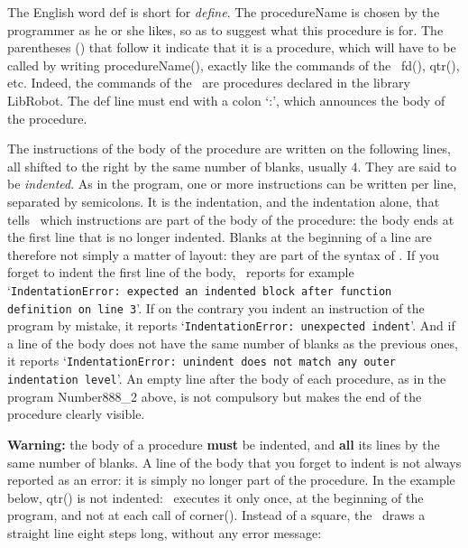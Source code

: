 The English word {\mcl def} is short for {\em define}.
The {\idt  procedureName} is chosen by the programmer
as he or she likes, so as to suggest what
this procedure is for. The parentheses {\idt ()} that follow it indicate
that it is a procedure, which will have to be called by writing {\idt procedureName()},
exactly like the commands of the \robot\ {\idt fd()}, {\idt qtr()}, etc.
Indeed, the commands of the \robot\ are procedures declared in the
library {\idt LibRobot}. The {\mcl def} line must end with
a colon `{\idt :}', which announces the body of the procedure.

The instructions of the body of the procedure are written on the following
lines, all shifted to the right by the same number of blanks,
usually 4. They are said to be {\em indented}.
As in the program, one or more instructions can be written per line, separated
by semicolons. It is the indentation, and the indentation alone, that tells \python\
which instructions are part of the body of the procedure: the body ends at
the first line that is no longer indented. Blanks at the beginning of a line are therefore
not simply a matter of layout: they are part of the syntax of \python.
If you forget to indent the first line of the body, \python\ reports for example
`{\tt IndentationError: expected an indented block after function definition on line 3}'.
If on the contrary you indent an instruction of the program by mistake, it reports
`{\tt IndentationError: unexpected indent}'. And if a line of the
body does not have the same number of blanks as the previous ones, it reports
`{\tt IndentationError: unindent does not match any outer indentation level}'.
An empty line after the body
of each procedure, as in the program {\idt Number888\_2} above,
is not compulsory but makes the end of the procedure clearly visible.

{\bf Warning:} the body of a procedure {\bf must} be indented, and
{\bf all} its lines by the same number of blanks. A line of the body that you forget
to indent is not always reported as an error: it is simply no longer
part of the procedure. In the example below, {\idt qtr()} is not indented:
\python\ executes it only once, at the beginning of the program, and not at each call of
{\idt corner()}. Instead of a square, the \robot\ draws a straight line eight steps long, without
any error message:

